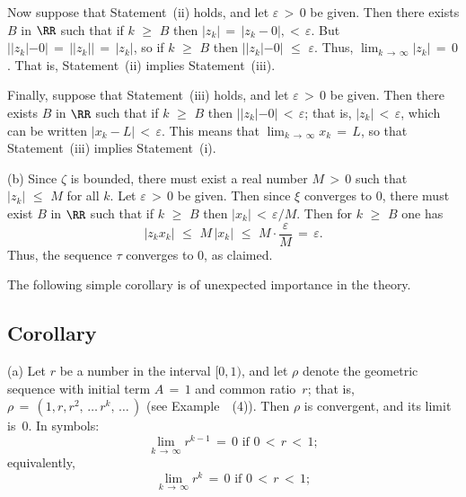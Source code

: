         Now suppose that Statement~(ii) holds, and let ${\varepsilon}\,>\,0$ be given.
    Then there exists $B$ in ${\RR}$ such that if $k\,\,{\geq}\,\,B$ then $|z_{k}| \,=\, |z_{k}-0|,<\,{\varepsilon}$.
    But $||z_{k}|-0| \,=\, ||z_{k}|| \,=\, |z_{k}|$, so if $k\,\,{\geq}\,\,B$ then $||z_{k}|-0|\,\,{\leq}\,\,{\varepsilon}$.
    Thus, $\lim_{k \,{\rightarrow}\, {\infty}} |z_{k}| \,=\, 0$.
    That is, Statement~(ii) implies Statement~(iii).

        Finally, suppose that Statement~(iii) holds, and let ${\varepsilon}\,>\,0$ be given.
    Then there exists $B$ in ${\RR}$ such that if $k\,\,{\geq}\,\,B$ then $||z_{k}|-0|\,<\,{\varepsilon}$;
    that is, $|z_{k}|\,<\,{\varepsilon}$, which can be written $|x_{k}-L|\,<\,{\varepsilon}$.
    This means that $\lim_{k \,{\rightarrow}\, {\infty}} x_{k} \,=\, L$, so that Statement~(iii) implies Statement~(i).

\V
        (b) Since ${\zeta}$ is bounded, there must exist a real number $M\,>\,0$ such that $|z_{k}|\,\,{\leq}\,\,M$ for all $k$.
    Let ${\varepsilon}\,>\,0$ be given.
    Then since ${\xi}$ converges to $0$, there must exist $B$ in ${\RR}$ such that if $k\,\,{\geq}\,\,B$ then $|x_{k}|\,<\,{\varepsilon}/M$.
    Then for $k\,\,{\geq}\,\,B$ one has
        \begin{displaymath} |z_{k}x_{k}|\,\,{\leq}\,\,M\,|x_{k}|\,\,{\leq}\,\,M{\cdot}\frac{{\varepsilon}}{M}
     \,=\, {\varepsilon}.
        \end{displaymath}
    Thus, the sequence ${\tau}$ converges to $0$, as claimed.

\VV

        The following simple corollary is of unexpected importance in the theory.

\V

        \subsection{\small{{\bf Corollary}}}
        \label{CorC20.15}



        \hspace*{\parindent}(a) Let $r$ be a number in the interval $[0,1)$,
    and let ${\rho}$ denote the geometric sequence with initial term $A \,=\, 1$ and common ratio~$r$;
    that is, ${\rho} \,=\, (1,r,r^{2},\,{\ldots}\,r^{k},\,{\ldots}\,)$ (see Example~~(4)).
    Then ${\rho}$ is convergent, and its limit is~$0$. In symbols:
        \begin{displaymath}
        \lim_{k \,{\rightarrow}\, {\infty}} r^{k-1} \,=\, 0 \mbox{ if $0\,<\,r\,<\,1$};
        \end{displaymath}
    equivalently,
        \begin{displaymath}
        \lim_{k \,{\rightarrow}\, {\infty}} r^{k} \,=\, 0 \mbox{ if $0\,<\,r\,<\,1$};
        \end{displaymath}



